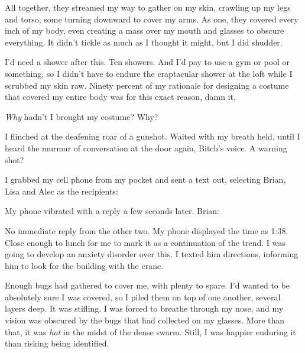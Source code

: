 All together, they streamed my way to gather on my skin, crawling up my legs and torso, some turning downward to cover my arms.  As one, they covered every inch of my body, even creating a mass over my mouth and glasses to obscure everything.  It didn't tickle as much as I thought it might, but I did shudder.



I'd need a shower after this.  Ten showers.  And I'd pay to use a gym or pool or something, so I didn't have to endure the craptacular shower at the loft while I scrubbed my skin raw.  Ninety percent of my rationale for designing a costume that covered my entire body was for this exact reason, damn it.



\emph{Why} hadn't I brought my costume?  Why?



I flinched at the deafening roar of a gunshot.  Waited with my breath held, until I heard the murmur of conversation at the door again, Bitch's voice.  A warning shot?



I grabbed my cell phone from my pocket and sent a text out, selecting Brian, Lisa and Alec as the recipients:






My phone vibrated with a reply a few seconds later. Brian:






No immediate reply from the other two.  My phone displayed the time as 1:38.  Close enough to lunch for me to mark it as a continuation of the trend.  I was going to develop an anxiety disorder over this.  I texted him directions, informing him to look for the building with the crane.



Enough bugs had gathered to cover me, with plenty to spare.  I'd wanted to be absolutely sure I was covered, so I piled them on top of one another, several layers deep.  It was stifling.  I was forced to breathe through my nose, and my vision was obscured by the bugs that had collected on my glasses.   More than that, it was \emph{hot} in the midst of the dense swarm.  Still, I was happier enduring it than risking being identified.



